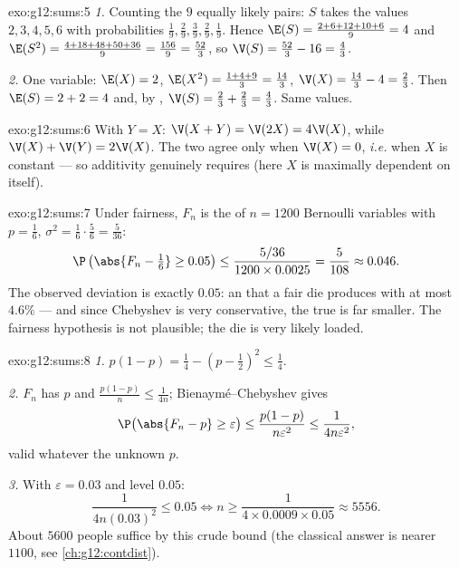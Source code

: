 \begin{solution}{exo:g12:sums:5}
\emph{1.} Counting the $9$ equally likely pairs: $S$ takes the values
$2, 3, 4, 5, 6$ with probabilities
$\frac19, \frac29, \frac39, \frac29, \frac19$. Hence
$\E(S) = \frac{2 + 6 + 12 + 10 + 6}{9} = 4$ and
$\E(S^2) = \frac{4 + 18 + 48 + 50 + 36}{9} = \frac{156}{9} = \frac{52}{3}$,
so $\V(S) = \frac{52}{3} - 16 = \frac43$.

\emph{2.} One variable: $\E(X) = 2$,
$\E(X^2) = \frac{1 + 4 + 9}{3} = \frac{14}{3}$,
$\V(X) = \frac{14}{3} - 4 = \frac23$. Then $\E(S) = 2 + 2 = 4$ and, by
, $\V(S) = \frac23 + \frac23 = \frac43$. Same values.
\end{solution}

\begin{solution}{exo:g12:sums:6}
With $Y = X$: $\V(X + Y) = \V(2X) = 4\V(X)$, while
$\V(X) + \V(Y) = 2\V(X)$. The two agree only when $\V(X) = 0$, \emph{i.e.}
when $X$ is constant --- so additivity genuinely requires 
(here $X$ is maximally dependent on itself).
\end{solution}

\begin{solution}{exo:g12:sums:7}
Under fairness, $F_n$ is the  of $n = 1200$ Bernoulli variables with
$p = \frac16$, $\sigma^2 = \frac16\cdot\frac56 = \frac{5}{36}$:
\[
\P\left(\abs{F_n - \tfrac16} \geq 0.05\right)
\leq \frac{5/36}{1200 \times 0.0025} = \frac{5}{108} \approx 0.046 .
\]
The observed deviation is exactly $0.05$: an  that a fair die produces
with  at most $4.6\%$ --- and since Chebyshev is very
conservative, the true  is far smaller. The fairness hypothesis
is not plausible; the die is very likely loaded.
\end{solution}

\begin{solution}{exo:g12:sums:8}
\emph{1.} $p(1-p) = \frac14 - \left(p - \frac12\right)^2 \leq \frac14$.

\emph{2.} $F_n$ has  $p$ and 
$\frac{p(1-p)}{n} \leq \frac{1}{4n}$; Bienaymé--Chebyshev gives
\[
\P\bigl(\abs{F_n - p} \geq \varepsilon\bigr)
\leq \frac{p(1-p)}{n\varepsilon^2} \leq \frac{1}{4n\varepsilon^2},
\]
valid whatever the unknown $p$.

\emph{3.} With $\varepsilon = 0.03$ and level $0.05$:
\[
\frac{1}{4n(0.03)^2} \leq 0.05
\iff n \geq \frac{1}{4 \times 0.0009 \times 0.05} \approx 5556 .
\]
About $5600$ people suffice by this crude bound (the classical
 answer is nearer $1100$, see
\cref{ch:g12:contdist}).
\end{solution}

